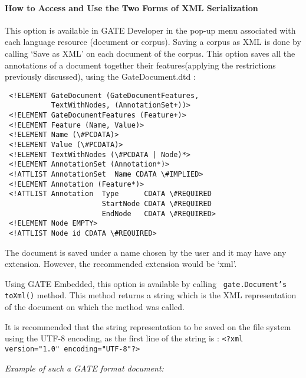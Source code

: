 \paragraph{How to Access and Use the Two Forms of XML
Serialization}


This option is available in GATE Developer in the pop-up menu
associated with each language resource (document or corpus). Saving
a corpus as XML is done by calling `Save as XML' on each document of
the corpus. This option saves all the annotations of a document
together their features(applying the restrictions previously
discussed), using the GateDocument.dtd :

\small
\begin{small}
\begin{verbatim}
 <!ELEMENT GateDocument (GateDocumentFeatures,
           TextWithNodes, (AnnotationSet+))>
 <!ELEMENT GateDocumentFeatures (Feature+)>
 <!ELEMENT Feature (Name, Value)>
 <!ELEMENT Name (\#PCDATA)>
 <!ELEMENT Value (\#PCDATA)>
 <!ELEMENT TextWithNodes (\#PCDATA | Node)*>
 <!ELEMENT AnnotationSet (Annotation*)>
 <!ATTLIST AnnotationSet  Name CDATA \#IMPLIED>
 <!ELEMENT Annotation (Feature*)>
 <!ATTLIST Annotation  Type      CDATA \#REQUIRED
                       StartNode CDATA \#REQUIRED
                       EndNode   CDATA \#REQUIRED>
 <!ELEMENT Node EMPTY>
 <!ATTLIST Node id CDATA \#REQUIRED>
\end{verbatim}
\end{small}
\nnormalsize

The document is saved under a name chosen by the user and it may
have any extension. However, the recommended extension would be
`xml'.

Using GATE Embedded, this option is available by calling {\tt
gate.Document's toXml()} method. This method returns a string
which is the XML representation of the document on which the
method was called.

 It is recommended that the string
representation to be saved on the file system using the UTF-8
encoding, as the first line of the string is : {\tt <?xml
version="1.0" encoding="UTF-8"?>}

{\em Example of such a GATE format document:}

